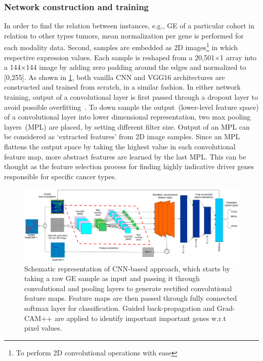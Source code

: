 \subsubsection{Network construction and training}
In order to find the relation between instances, e.g., GE of a particular cohort in relation to other types tumors,  mean normalization per gene is performed for each modality data. Second, samples are embedded as 2D images\footnote{To perform 2D convolutional operations with ease} in which respective expression values. Each sample is reshaped from a 20,501$\times$1 array into a 144$\times$144 image by adding zero padding around the edges and normalized to [0,255].%
As shown in \cref{fig:clstm2}, both vanilla CNN and VGG16 architectures are constructed and trained from scratch, in a similar fashion. In either network training, output of a convolutional layer is first passed through a dropout layer to avoid possible overfitting~\cite{vardropout}. To down sample the output~(lower-level feature space) of a convolutional layer into lower dimensional representation, two max pooling layers~(MPL) are placed, by setting different filter size. Output of an MPL can be considered as `extracted features' from 2D image samples. Since an MPL flattens the output space by taking the highest value in each convolutional feature map, more abstract features are learned by the last MPL. This can be thought as the feature selection process for finding highly indicative driver genes responsible for specific cancer types.

\begin{figure}[h]
	\centering
	\includegraphics[scale=0.5]{images/clstm.PNG}
    \caption[Schematic representation of CNN-based approach]{Schematic representation of CNN-based approach, which starts by taking a raw GE sample as input and passing it through convolutional and pooling layers to generate rectified convolutional feature maps. Feature maps are then passed through fully connected softmax layer for classification. Guided back-propagation and Grad-CAM++ are applied to identify important important genes w.r.t pixel values.}	
	\label{fig:clstm2}
\end{figure}

